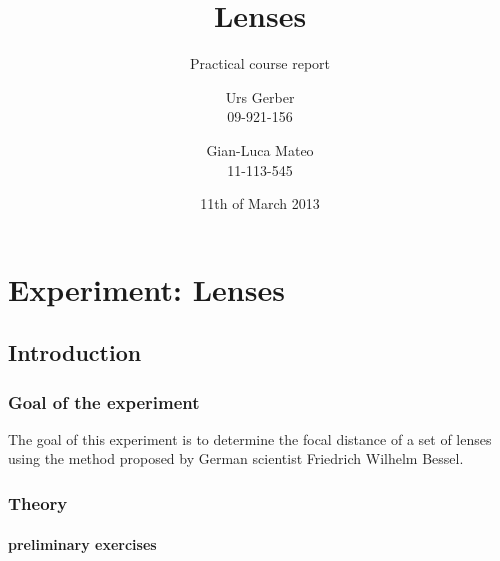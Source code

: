\documentclass{scrreprt}
\author{Urs Gerber\\09-921-156 \and Gian-Luca Mateo\\11-113-545}
\date{11th of March 2013}
\title{Lenses}
\subtitle{Practical course report}
\begin{document}
\maketitle

\tableofcontents
\newpage

\chapter{Experiment: Lenses}

\section{Introduction}

\subsection{Goal of the experiment}
The goal of this experiment is to determine the focal distance of a set of lenses using the method proposed by German scientist Friedrich Wilhelm Bessel.

\subsection{Theory}
\subsubsection{preliminary exercises}
\end{document}
